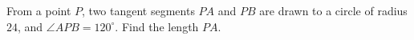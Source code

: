 From a point $P$, two tangent segments $PA$ and $PB$ are drawn to a circle of radius $24$, and $\angle APB=120^\circ$. Find the length $PA$.
